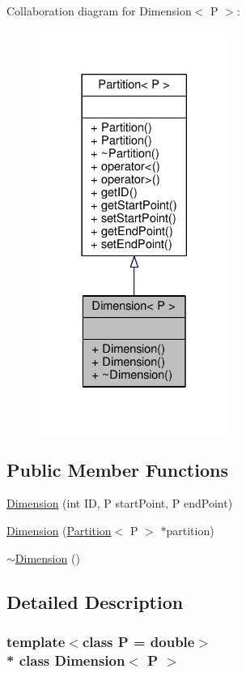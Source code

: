 Collaboration diagram for Dimension$<$ P $>$\+:
\nopagebreak
\begin{figure}[H]
\begin{center}
\leavevmode
\includegraphics[width=177pt]{classDimension__coll__graph}
\end{center}
\end{figure}
\subsection*{Public Member Functions}
\begin{DoxyCompactItemize}
\item 
\hyperlink{classDimension_a14b3745b4d7691b33a244306c94c6048}{Dimension} (int ID, P start\+Point, P end\+Point)
\item 
\hyperlink{classDimension_a593dbdfb02f5f33fad25d51a083c3a17}{Dimension} (\hyperlink{classPartition}{Partition}$<$ P $>$ $\ast$partition)
\item 
\hyperlink{classDimension_a371288fa5249dcc26e624a60cd28c92f}{$\sim$\+Dimension} ()
\end{DoxyCompactItemize}


\subsection{Detailed Description}
\subsubsection*{template$<$class P = double$>$\\*
class Dimension$<$ P $>$}

